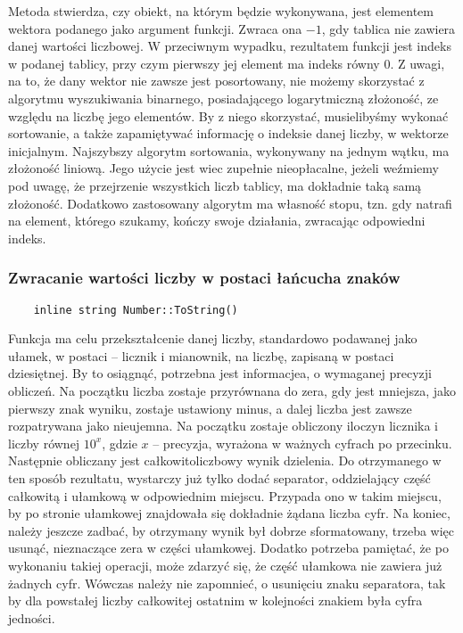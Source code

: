 \documentclass[oneside,a4paper]{book}
\begin{document}
	Metoda stwierdza, czy obiekt, na którym będzie wykonywana, jest elementem wektora podanego jako argument funkcji. Zwraca ona $-1$, gdy tablica nie zawiera danej wartości liczbowej. W przeciwnym wypadku, rezultatem funkcji jest indeks w podanej tablicy, przy czym pierwszy jej element ma indeks równy $0$. Z uwagi, na to, że dany wektor nie zawsze jest posortowany, nie możemy skorzystać z algorytmu wyszukiwania binarnego, posiadającego logarytmiczną złożoność, ze względu na liczbę jego elementów. By z niego skorzystać, musielibyśmy wykonać sortowanie, a także zapamiętywać informację o indeksie danej liczby, w wektorze inicjalnym. Najszybszy algorytm sortowania, wykonywany na jednym wątku, ma złożoność liniową. Jego użycie jest wiec zupełnie nieopłacalne, jeżeli weźmiemy pod uwagę, że przejrzenie wszystkich liczb tablicy, ma dokładnie taką samą złożoność. Dodatkowo zastosowany algorytm ma własność stopu, tzn. gdy natrafi na element, którego szukamy, kończy swoje działania, zwracając odpowiedni indeks.
	\\
	
	\subsubsection{Zwracanie wartości liczby w postaci łańcucha znaków}
	\begin{lstlisting}
	inline string Number::ToString()
	\end{lstlisting}
	
	Funkcja ma celu przekształcenie danej liczby, standardowo podawanej jako ułamek, w postaci -- licznik i mianownik, na liczbę, zapisaną w postaci dziesiętnej. By to osiągnąć, potrzebna jest informacjea, o wymaganej precyzji obliczeń. Na początku liczba zostaje przyrównana do zera, gdy jest mniejsza, jako pierwszy znak wyniku, zostaje ustawiony minus, a dalej liczba jest zawsze rozpatrywana jako nieujemna. Na początku zostaje obliczony iloczyn licznika i liczby równej $10^x$, gdzie $x$ -- precyzja, wyrażona w ważnych cyfrach po przecinku. Następnie obliczany jest całkowitoliczbowy wynik dzielenia. Do otrzymanego w ten sposób rezultatu, wystarczy już tylko dodać separator, oddzielający część całkowitą i ułamkową w odpowiednim miejscu. Przypada ono w takim miejscu, by po stronie ułamkowej znajdowała się dokładnie żądana liczba cyfr. Na koniec, należy jeszcze zadbać, by otrzymany wynik był dobrze sformatowany, trzeba więc usunąć, nieznaczące zera w części ułamkowej. Dodatko potrzeba pamiętać, że po wykonaniu takiej operacji, może zdarzyć się, że część ułamkowa nie zawiera już żadnych cyfr. Wówczas należy nie zapomnieć, o usunięciu znaku separatora, tak by dla powstałej liczby całkowitej ostatnim w kolejności znakiem była cyfra jedności.
	\\
	
\end{document}

